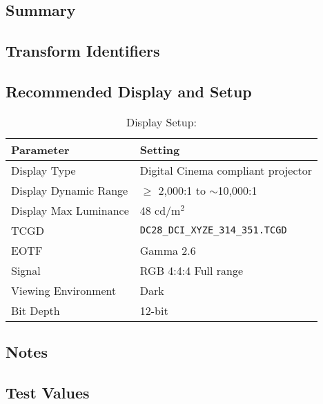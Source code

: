\section[DCDM]{\shortName{}}
\label{sec:odt-details-\id}

\subsection{Summary}
\label{subsec:summary-\id}

\lipsum[1-2]  %

\subsection{Transform Identifiers} 
\label{subsec:odt-ident-\id}

\subsection{Recommended Display and Setup}
\label{subsec:setup-\id}

\begin{table}[ht!]
    \centering
        \begin{tabular}{|p{1.5in}|p{3in}|}
            \hline
            \textbf{Parameter} 		& 	\textbf{Setting} 				 		\\ \hline
            Display Type 			&	Digital Cinema compliant projector 		\\ \hline
            Display Dynamic Range 	& 	$\geq$ 2,000:1 to $\sim$10,000:1 		\\ \hline
            Display Max Luminance 	& 	48 cd/m$^2$								\\ \hline
            TCGD	 				& 	\texttt{DC28\_DCI\_XYZE\_314\_351.TCGD}	\\ \hline
            EOTF					& 	Gamma 2.6 								\\ \hline
            Signal 					&	RGB 4:4:4 Full range					\\ \hline
            Viewing Environment 	& 	Dark 									\\ \hline
            Bit Depth 				& 	12-bit 									\\ \hline 
    \end{tabular}
    \caption{Display Setup: \shortName{}} 
    \label{tab:setup-\id}
\end{table}

\subsection{Notes}
\label{subsec:notes-\id}

\lipsum[1-2] %


\subsection{Test Values}
\label{subsec:testValues-\id}

\testValuesSubSec{}


